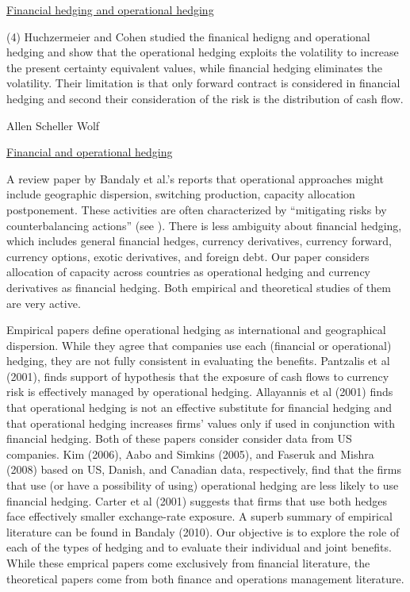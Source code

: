 \documentclass[mnsc,nonblindrev,copyedit]{informs2_wz} %
\begin{document}
\noindent \underline{Financial hedging and operational hedging}


(4) Huchzermeier and Cohen \cite{Huchzermeier} studied the finanical hedigng and operational hedging and show that the operational hedging exploits the volatility to increase the present certainty equivalent values, while financial hedging eliminates the volatility. Their limitation is that only forward contract is considered in financial hedging and second their consideration of the risk is the distribution of cash flow. 


Allen Scheller Wolf



\noindent \underline{Financial and operational hedging}

A review paper by Bandaly et al.'s \cite{Bandaly_supply_2010} reports that operational approaches might include geographic dispersion, switching production, capacity allocation postponement. These activities are often characterized by ``mitigating risks by counterbalancing actions'' (see \cite{vanmieghem2003}).  %
There is less ambiguity about financial hedging, which includes general financial hedges, currency derivatives, currency forward, currency options, exotic derivatives, and foreign debt.  Our paper considers allocation of capacity across countries as operational hedging and currency derivatives as financial hedging. Both empirical and theoretical studies of them are very active.


Empirical papers define operational hedging as international and geographical dispersion.  While they agree that companies use each (financial or operational) hedging, they are not fully consistent in evaluating the benefits.   
Pantzalis et al (2001), finds support of hypothesis that the exposure of cash flows to currency risk is effectively managed by operational hedging.
Allayannis et al (2001) finds that operational hedging is not an effective substitute for financial hedging and that operational hedging increases firms' values only if used in conjunction with financial hedging.  Both of these papers consider consider data from US companies. 
Kim (2006), Aabo and Simkins (2005), and Faseruk and Mishra (2008) based on US, Danish, and Canadian data, respectively, find that the firms that use (or have a possibility of using) operational hedging are less likely to use financial hedging. Carter et al (2001) suggests that firms that use both hedges face effectively smaller exchange-rate exposure.  A superb summary of empirical literature can be found in Bandaly (2010).  Our objective is to explore the role of each of the types of hedging and to evaluate their individual and joint benefits. While these emprical papers come exclusively from financial literature, the theoretical papers come from both finance and operations management literature. 
\end{document}
